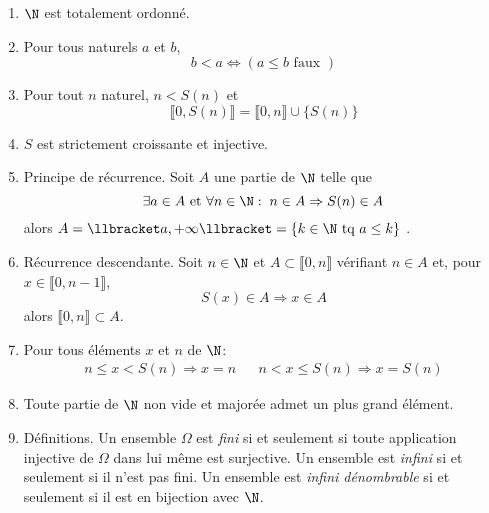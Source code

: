 \begin{enumerate}
\item $\N$ est totalement ordonné.

\item Pour tous naturels $a$ et $b$,
\begin{displaymath}
 b < a \Leftrightarrow \left( a\leq b \text{ faux } \right) 
\end{displaymath}

\item Pour tout $n$ naturel, $n < S(n)$ et 
\begin{displaymath}
 \llbracket 0 , S(n) \rrbracket = \llbracket 0 , n \rrbracket \cup \{S(n)\}
\end{displaymath}

\item  $S$ est strictement croissante et injective.

\item  Principe de récurrence. Soit $A$ une partie de $\N$ telle que
\begin{displaymath}
 \exists a \in A \text{ et } \forall n \in \N :\; n\in A \Rightarrow S(n) \in A
\end{displaymath}
alors $A= \llbracket a , +\infty\llbracket =\left\lbrace k\in \N \text{ tq } a\leq k\right\rbrace$ .

\item  Récurrence descendante. Soit $n\in \N$ et $A\subset \llbracket 0,n \rrbracket$ vérifiant $n\in A$ et, pour $x\in \llbracket 0,n-1 \rrbracket$, 
\begin{displaymath}
 S(x) \in A \Rightarrow x \in A
\end{displaymath}
alors $\llbracket 0,n \rrbracket \subset A$.

\item  Pour tous éléments $x$ et $n$ de $\N$:
\begin{align*}
 n \leq x < S(n) \Rightarrow x=n & & n < x \leq S(n) \Rightarrow x = S(n)
\end{align*}

\item  Toute partie de $\N$ non vide et majorée admet un plus grand élément.

\item Définitions. Un ensemble $\Omega$ est \emph{fini} si et seulement si toute application injective de $\Omega$ dans lui même est surjective. Un ensemble est \emph{infini} si et seulement si il n'est pas fini. Un ensemble est \emph{infini dénombrable} si et seulement si il est en bijection avec $\N$.
 

\end{enumerate}
